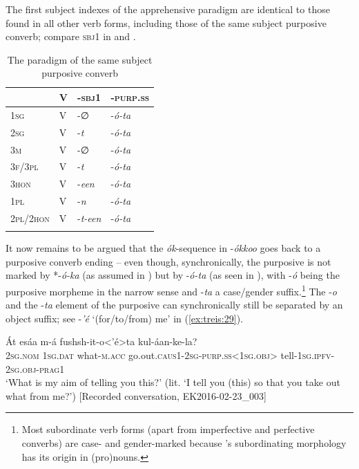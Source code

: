 \documentclass[output=paper,colorlinks,citecolor=brown,]{langscibook}
\begin{document}
The first subject indexes of the apprehensive paradigm are identical to those found in all other verb forms, including those of the same subject purposive converb; compare \textsc{sbj1} in  and .

\begin{table}
    \begin{tabular}{llll}
\lsptoprule
&  V & -\textsc{sbj1} & -\textsc{purp.ss}\\
\midrule
\textsc{1sg} & V & -∅ & -\textit{ó-ta}\\
\textsc{2sg} & V &	-\textit{t}	& -\textit{ó-ta}\\
\textsc{3m}	& V & -∅ & -\textit{ó-ta}\\
\textsc{3f/3pl} & V & -\textit{t} & -\textit{ó-ta}\\
\textsc{3hon} & V & -\textit{een} &	-\textit{ó-ta}\\
\textsc{1pl} & V & 	-\textit{n} & -\textit{ó-ta}\\
\textsc{2pl/2hon} & V &	-\textit{t-een} & -\textit{ó-ta}\\
\lspbottomrule
\end{tabular}
    \caption{The paradigm of the same subject purposive converb}
    \label{tab:treis:6}
\end{table}

It now remains to be argued that the \textit{ók}-sequence in \nobreakdash-\textit{ókkoo} goes back to a purposive converb ending -- even though, synchronically, the purposive is not marked by *-\textit{ó-ka} (as assumed in ) but by \nobreakdash-\textit{ó-ta} (as seen in ), with \nobreakdash-\textit{ó} being the purposive morpheme in the narrow sense and \nobreakdash-\textit{ta} a case\slash gender suffix.\footnote{Most subordinate verb forms (apart from imperfective and perfective converbs) are case- and gender-marked because 's subordinating morphology has its origin in (pro)nouns.} The \nobreakdash-\textit{o} and the \nobreakdash-\textit{ta} element of the purposive can synchronically still be separated by an object suffix; see \nobreakdash-\textit{'é} `(for\slash to\slash from) me' in (\ref{ex:treis:29}).

\ea\label{ex:treis:29}
\gll Át esáa m-á fushsh-it-o<'é>ta kul-áan-ke-la?\\
\textsc{2sg.nom} \textsc{1sg.dat} what-\textsc{m.acc}	go.out.\textsc{caus1-2sg-purp.ss<1sg.obj>} tell-\textsc{1sg.ipfv-2sg.obj-prag1}\\
\glt `What is my aim of telling you this?' (lit. `I tell you (this) so that you take out what from me?')   [Recorded conversation, EK2016-02-23\_003]
\z 
\end{document}
